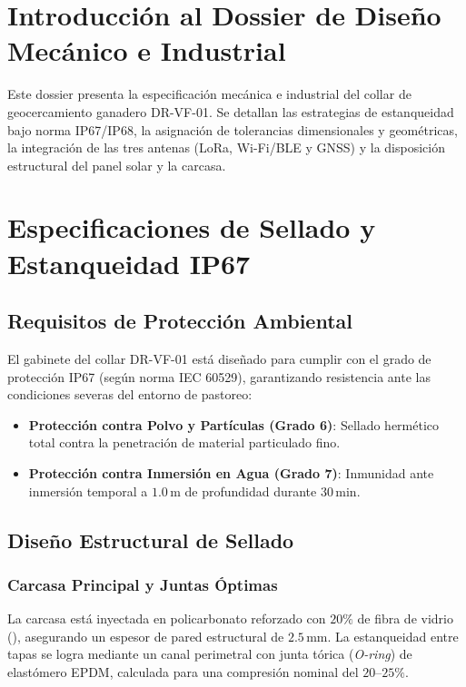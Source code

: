 \section{Introducción al Dossier de Diseño Mecánico e Industrial}

Este dossier presenta la especificación mecánica e industrial del collar de geocercamiento ganadero DR-VF-01. Se detallan las estrategias de estanqueidad bajo norma IP67/IP68, la asignación de tolerancias dimensionales y geométricas, la integración de las tres antenas (LoRa, Wi-Fi/BLE y GNSS) y la disposición estructural del panel solar y la carcasa.

\section{Especificaciones de Sellado y Estanqueidad IP67}

\subsection{Requisitos de Protección Ambiental}

El gabinete del collar DR-VF-01 está diseñado para cumplir con el grado de protección IP67 (según norma IEC 60529), garantizando resistencia ante las condiciones severas del entorno de pastoreo:

\begin{itemize}[leftmargin=*]
    \item \textbf{Protección contra Polvo y Partículas (Grado 6)}: Sellado hermético total contra la penetración de material particulado fino.
    \item \textbf{Protección contra Inmersión en Agua (Grado 7)}: Inmunidad ante inmersión temporal a $1.0\,\text{m}$ de profundidad durante $30\,\text{min}$.
\end{itemize}

\subsection{Diseño Estructural de Sellado}

\subsubsection{Carcasa Principal y Juntas Óptimas}

La carcasa está inyectada en policarbonato reforzado con $20\%$ de fibra de vidrio (), asegurando un espesor de pared estructural de $2.5\,\text{mm}$. La estanqueidad entre tapas se logra mediante un canal perimetral con junta tórica (\textit{O-ring}) de elastómero EPDM, calculada para una compresión nominal del $20\text{--}25\%$.

